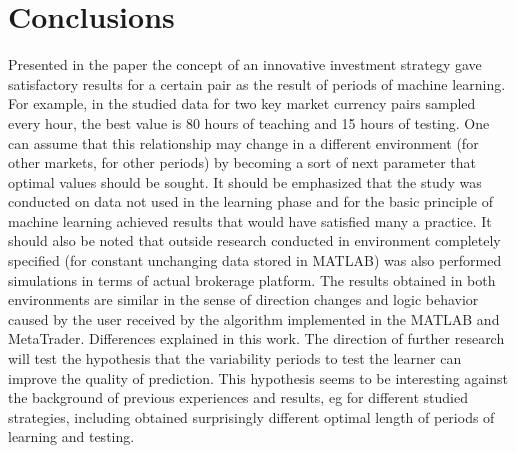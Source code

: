 \documentclass[runningheads,a4paper]{llncs}
\begin{document}
\section{Conclusions}

Presented in the paper the concept of an innovative investment strategy gave satisfactory results for a certain pair as the result of periods of machine learning. For example, in the studied data for two key market currency pairs sampled every hour, the best value is 80 hours of teaching and 15 hours of testing. One can assume that this relationship may change in a different environment (for other markets, for other periods) by becoming a sort of next parameter that optimal values should be sought. It should be emphasized that the study was conducted on data not used in the learning phase and for the basic principle of machine learning achieved results that would have satisfied many a practice. It should also be noted that outside research conducted in environment completely specified (for constant unchanging data stored in MATLAB) was also performed simulations in terms of actual brokerage platform. The results obtained in both environments are similar in the sense of direction changes and logic behavior caused by the user received by the algorithm implemented in the MATLAB and MetaTrader. Differences explained in this work.
The direction of further research will test the hypothesis that the variability periods to test the learner can improve the quality of prediction. This hypothesis seems to be interesting against the background of previous experiences and results, eg for different studied strategies, including \cite{Wilinski2014}\cite{Wilinski}\cite{sinclare}\cite{krutsinger} obtained surprisingly different optimal length of periods of learning and testing.





\end{document}
